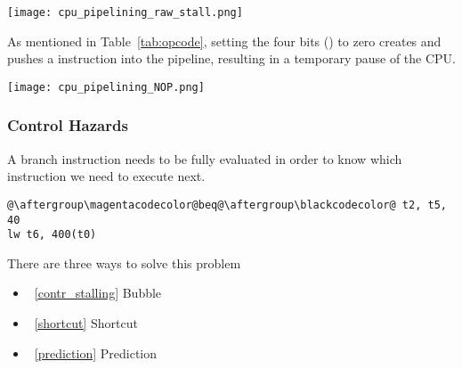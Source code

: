 \texttt{[image: cpu\_pipelining\_raw\_stall.png]}


\newpar{}
As mentioned in Table~\ref{tab:opcode}, setting the four bits () to zero creates and pushes a  instruction into the pipeline, resulting in a temporary pause of the CPU. 
\begin{center}
    \texttt{[image: cpu\_pipelining\_NOP.png]}
\end{center}

\subsubsection{Control Hazards}\label{control hazards}

A branch instruction needs to be fully evaluated in order to know which instruction we need to execute next.

\begin{lstlisting}[escapechar=@]
@\aftergroup\magentacodecolor@beq@\aftergroup\blackcodecolor@ t2, t5, 40
lw t6, 400(t0)
\end{lstlisting}

There are three ways to solve this problem
\begin{itemize}
    \item~\ref{contr_stalling} Bubble
    \item~\ref{shortcut} Shortcut
    \item~\ref{prediction} Prediction
\end{itemize}

